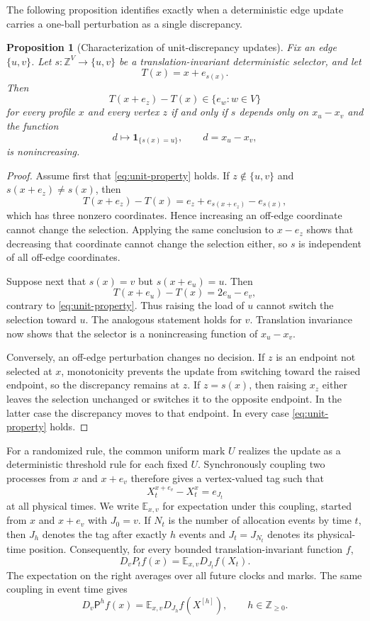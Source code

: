 \documentclass[11pt]{article}
\newtheorem{proposition}[proposition]{Proposition}
\theoremstyle{remark}
\newcommand{\E}{\mathbb{E}}
\newcommand{\Z}{\mathbb{Z}}
\newcommand{\one}{\mathbf{1}}
\begin{document}
The following proposition identifies exactly when a deterministic edge update carries a one-ball perturbation as a single discrepancy.

\begin{proposition}[Characterization of unit-discrepancy updates]\label{prop:characterization}
Fix an edge $\{u,v\}$. Let $s:\Z^V\to\{u,v\}$ be a translation-invariant deterministic selector, and let
\[
 T(x)=x+e_{s(x)}.
\]
Then
\[
 T(x+e_z)-T(x)\in\{e_w:w\in V\}
 \tag{2.2}\label{eq:unit-property}
\]
for every profile $x$ and every vertex $z$ if and only if $s$ depends only on $x_u-x_v$ and the function
\[
 d\longmapsto \one_{\{s(x)=u\}},\qquad d=x_u-x_v,
\]
is nonincreasing.
\end{proposition}

\begin{proof}
Assume first that \eqref{eq:unit-property} holds. If $z\notin\{u,v\}$ and $s(x+e_z)\ne s(x)$, then
\[
 T(x+e_z)-T(x)=e_z+e_{s(x+e_z)}-e_{s(x)},
\]
which has three nonzero coordinates. Hence increasing an off-edge coordinate cannot change the selection. Applying the same conclusion to $x-e_z$ shows that decreasing that coordinate cannot change the selection either, so $s$ is independent of all off-edge coordinates.

Suppose next that $s(x)=v$ but $s(x+e_u)=u$. Then
\[
 T(x+e_u)-T(x)=2e_u-e_v,
\]
contrary to \eqref{eq:unit-property}. Thus raising the load of $u$ cannot switch the selection toward $u$. The analogous statement holds for $v$. Translation invariance now shows that the selector is a nonincreasing function of $x_u-x_v$.

Conversely, an off-edge perturbation changes no decision. If $z$ is an endpoint not selected at $x$, monotonicity prevents the update from switching toward the raised endpoint, so the discrepancy remains at $z$. If $z=s(x)$, then raising $x_z$ either leaves the selection unchanged or switches it to the opposite endpoint. In the latter case the discrepancy moves to that endpoint. In every case \eqref{eq:unit-property} holds.
\end{proof}

For a randomized rule, the common uniform mark $U$ realizes the update as a deterministic threshold rule for each fixed $U$. Synchronously coupling two processes from $x$ and $x+e_v$ therefore gives a vertex-valued tag such that
\[
 X_t^{x+e_v}-X_t^x=e_{J_t}
 \tag{2.3}\label{eq:one-ball-coupling}
\]
at all physical times. We write $\E_{x,v}$ for expectation under this coupling, started from $x$ and $x+e_v$ with $J_0=v$. If $N_t$ is the number of allocation events by time $t$, then $J_h$ denotes the tag after exactly $h$ events and $J_t=J_{N_t}$ denotes its physical-time position. Consequently, for every bounded translation-invariant function $f$,
\[
 D_vP_tf(x)=\E_{x,v}D_{J_t}f(X_t).
 \tag{2.4}\label{eq:derivative-tag}
\]
The expectation on the right averages over all future clocks and marks. The same coupling in event time gives
\[
 D_v\mathsf P^h f(x)=\E_{x,v}D_{J_h}f(X^{[h]}),
 \qquad h\in\Z_{\ge0}.
 \tag{2.5}\label{eq:derivative-tag-discrete}
\]
\end{document}
